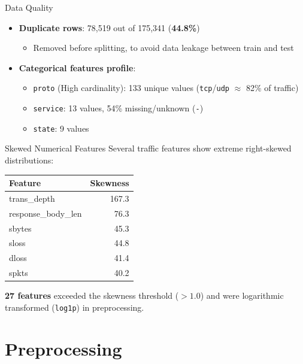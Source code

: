 \documentclass{beamer}
\begin{document}
\begin{frame}{Data Quality}
  \begin{itemize}
    \item \textbf{Duplicate rows}: 78,519 out of 175,341 (\textbf{44.8\%})
      \begin{itemize}
        \item Removed before splitting, to avoid data leakage between
          train and test
      \end{itemize}
    \vspace{0.3cm}
    \item \textbf{Categorical features profile}:
      \begin{itemize}
        \item \texttt{proto} (High cardinality): 133 unique values (\texttt{tcp}/\texttt{udp}
          $\approx$ 82\% of traffic)
        \item \texttt{service}: 13 values, 54\% missing/unknown (\texttt{-})
        \item \texttt{state}: 9 values
      \end{itemize}
  \end{itemize}
\end{frame}

\begin{frame}{Skewed Numerical Features}
  Several traffic features show extreme right-skewed distributions:
  \begin{center}
    \begin{tabular}{lr}
      \toprule
      \textbf{Feature} & \textbf{Skewness} \\
      \midrule
      trans\_depth & 167.3 \\
      response\_body\_len & 76.3 \\
      sbytes & 45.3 \\
      sloss & 44.8 \\
      dloss & 41.4 \\
      spkts & 40.2 \\
      \bottomrule
    \end{tabular}
  \end{center}
  \vspace{0.3cm}
  \textbf{27 features} exceeded the skewness threshold ($> 1.0$) and were logarithmic transformed (\texttt{log1p}) in preprocessing.
\end{frame}

\section{Preprocessing}
\end{document}
